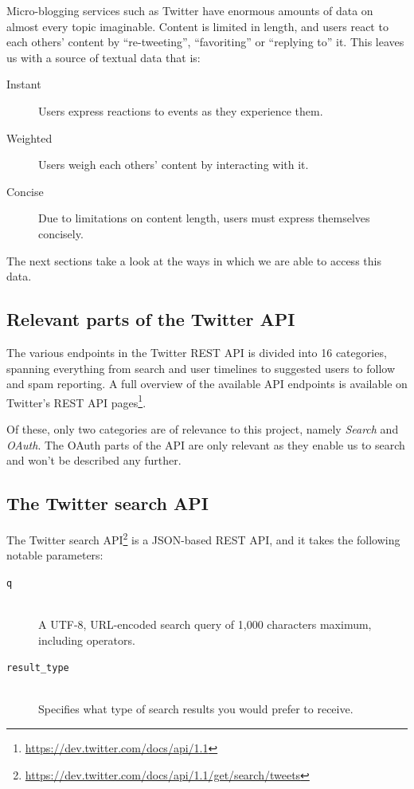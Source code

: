 Micro-blogging services such as Twitter have enormous amounts of data on almost every topic imaginable. Content is limited in length, and users react to each others' content by ``re-tweeting'', ``favoriting'' or ``replying to'' it. This leaves us with a source of textual data that is:

\begin{description}
  \item[Instant] Users express reactions to events as they experience them.
  \item[Weighted] Users weigh each others' content by interacting with it.
  \item[Concise] Due to limitations on content length, users must express themselves concisely.
\end{description}

The next sections take a look at the ways in which we are able to access this data.

\subsection{Relevant parts of the Twitter API} %
\label{sub:relevant_parts_of_the_twitter_api}

The various endpoints in the Twitter REST API is divided into 16 categories, spanning everything from search and user timelines to suggested users to follow and spam reporting. A full overview of the available API endpoints is available on Twitter's REST API pages\footnote{\url{https://dev.twitter.com/docs/api/1.1}}.

Of these, only two categories are of relevance to this project, namely \emph{Search} and \emph{OAuth}. The OAuth parts of the API are only relevant as they enable us to search and won't be described any further.

\subsection{The Twitter search API}
\label{ssec:search_api}

The Twitter search API\footnote{\url{https://dev.twitter.com/docs/api/1.1/get/search/tweets}} is a JSON-based REST API, and it takes the following notable parameters:

\begin{description}
  \item[\texttt{q}] \hfill \\
    A UTF-8, URL-encoded search query of 1,000 characters maximum, including operators.
  \item[\texttt{result\_type}] \hfill \\
    Specifies what type of search results you would prefer to receive.
\end{description}


